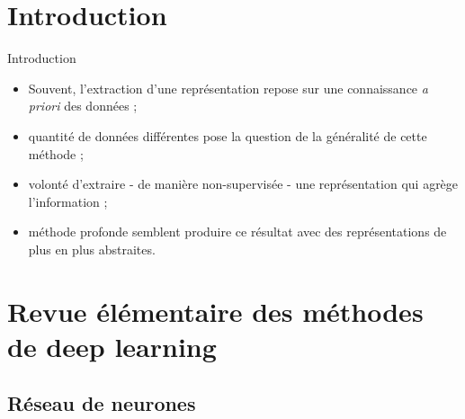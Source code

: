 \section*{Introduction}

\begin{frame}{Introduction}
\begin{itemize}
\item Souvent, l'extraction d'une représentation repose sur une connaissance \emph{a priori} des données ;

\item quantité de données différentes pose la question de la généralité de cette méthode ;

\item volonté d'extraire - de manière non-supervisée - une représentation qui agrège l'information ; 

\item méthode profonde semblent produire ce résultat avec des représentations de plus en plus abstraites.
\end{itemize}
\end{frame}



\section{Revue élémentaire des méthodes de deep learning}

\subsection{Réseau de neurones}

